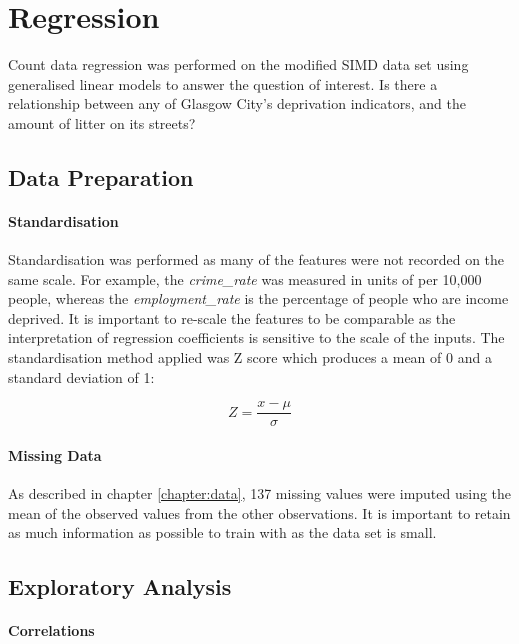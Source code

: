 \documentclass{thesis}
\begin{document}
\section{Regression}

Count data regression was performed on the modified SIMD data set using generalised linear models to answer the question of interest. Is there a relationship between any of Glasgow City's deprivation indicators, and the amount of litter on its streets?

\subsection{Data Preparation}

\paragraph{Standardisation} 

Standardisation was performed as many of the features were not recorded on the same scale. For example, the \textit{crime\_rate} was measured in units of per 10,000 people, whereas the \textit{employment\_rate} is the percentage of people who are income deprived. It is important to re-scale the features to be comparable as the interpretation of regression coefficients is sensitive to the scale of the inputs. The standardisation method applied was Z score which produces a mean of 0 and a standard deviation of 1:

\begin{equation}
    Z = \frac{x - \mu}{\sigma}
\end{equation}

\paragraph{Missing Data} 

As described in chapter \ref{chapter:data}, 137 missing values were imputed using the mean of the observed values from the other observations. It is important to retain as much information as possible to train with as the data set is small.

\subsection{Exploratory Analysis}

\paragraph{Correlations}
\end{document}
